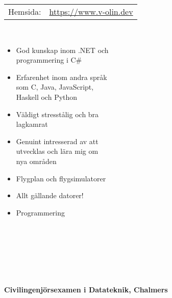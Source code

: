 \documentclass[11pt,oneside,a4paper,titlepage]{article}
\begin{document}
\begin{tcolorbox}
\begin{minipage}[t]{8cm}
\begin{tcolorbox}[grow to left by=15pt,colframe=sup-lgray,colback=sup-lgray,sharp corners]
{\begin{tabular}{l l}
                    Hemsida: & \href{https://www.v-olin.dev}{https://www.v-olin.dev} \\
                \end{tabular} \\
                \begin{itemize}
                    \item{God kunskap inom .NET och\\programmering i C\#}
                    \item{Erfarenhet inom andra språk\\som C, Java, JavaScript,\\Haskell och Python}
                    \item{Väldigt stresstålig och bra\\lagkamrat}
                    \item{Genuint intresserad av att\\utvecklas och lära mig om\\nya områden}
                    \vspace*{10pt}
                \end{itemize}
                \begin{itemize}
                    \item{Flygplan och flygsimulatorer}
                    \item{Allt gällande datorer!}
                    \item{Programmering\\\\\\\\\\}
                \end{itemize}
            }            
        \end{tcolorbox}
    \end{minipage}
    \begin{minipage}[t]{12cm}
        \vspace*{-18.2pt}
        \begin{tcolorbox}[grow to left by=-10pt,colframe=white,colback=white,sharp corners]
            {\selectfont
                \\
                \\\textbf{Civilingenjörsexamen i Datateknik, Chalmers} \\
}
\end{tcolorbox}
\end{minipage}
\end{tcolorbox}
\end{document}
